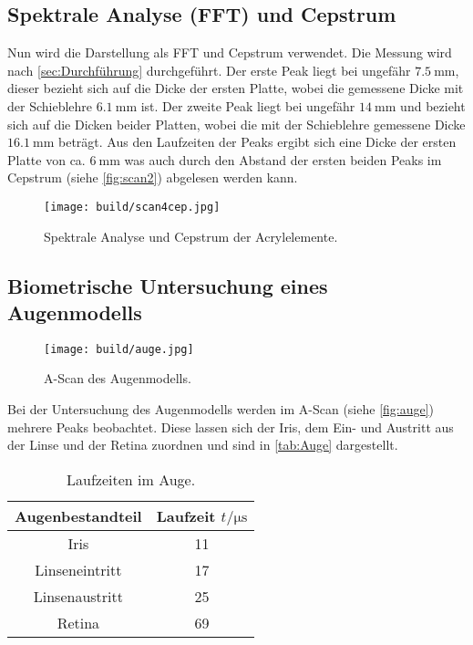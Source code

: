 \subsection{Spektrale Analyse (FFT) und Cepstrum}
\label{subsec:FFT}
Nun wird die Darstellung als FFT und Cepstrum verwendet. 
Die Messung wird nach \autoref{sec:Durchführung} durchgeführt.
Der erste Peak liegt bei ungefähr $\qty{7,5}{\milli\meter}$, dieser bezieht sich auf die Dicke der ersten Platte, wobei die gemessene 
Dicke mit der Schieblehre $\qty{6.1}{\milli\meter}$ ist.
Der zweite Peak liegt bei ungefähr $\qty{14}{\milli\meter}$ und bezieht sich auf die Dicken beider Platten, wobei die mit der Schieblehre gemessene
Dicke $\qty{16.1}{\milli\meter}$ beträgt. 
Aus den Laufzeiten der Peaks ergibt sich eine Dicke der ersten Platte von ca. $\qty{6}{\milli\meter}$ was auch durch den Abstand der ersten beiden
Peaks im Cepstrum (siehe \autoref{fig:scan2}) abgelesen werden kann. 
\begin{figure}[H]
  \centering
  \texttt{[image: build/scan4cep.jpg]}
  \caption {Spektrale Analyse und Cepstrum der Acrylelemente.}
  \label{fig:scan2}
\end{figure}

\subsection{Biometrische Untersuchung eines Augenmodells}
\label{subsec:Augew}

\begin{figure}[H]
  \centering
  \texttt{[image: build/auge.jpg]}
  \caption {A-Scan des Augenmodells.}
  \label{fig:auge}
\end{figure}

Bei der Untersuchung des Augenmodells werden im A-Scan (siehe \autoref{fig:auge}) mehrere Peaks beobachtet.
Diese lassen sich der Iris, dem Ein- und Austritt aus der Linse und der Retina zuordnen und sind in \autoref{tab:Auge} dargestellt.
\begin{table}[H]
  \centering
  \caption{Laufzeiten im Auge.}
  \label{tab:Auge}
  \begin{tabular}{c S[table-format=2.0] }
  \toprule
  {Augenbestandteil} & {Laufzeit $t / \si{\micro\second}$} \\
  \midrule
    Iris            &  11 \\
    Linseneintritt  &  17 \\
    Linsenaustritt  &  25 \\
    Retina          &  69 \\
  \bottomrule
  \end{tabular}
\end{table}

